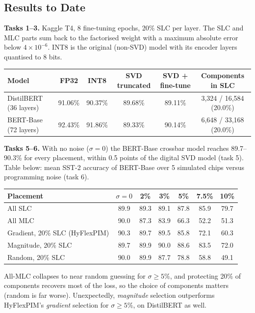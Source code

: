\documentclass[10pt,a4paper]{article}
\begin{document}
\subsection{Results to Date}
\textbf{Tasks 1--3.} Kaggle T4, 8 fine-tuning epochs, 20\% SLC per layer. The SLC and MLC parts sum back
to the factorised weight with a maximum absolute error below $4\times10^{-6}$. INT8 is the original
(non-SVD) model with its encoder layers quantised to 8 bits.

\begin{table}[h]
\centering\small
\begin{tabular}{@{}lccccc@{}}
\toprule
Model & FP32 & INT8 & SVD truncated & SVD + fine-tune & Components in SLC \\
\midrule
DistilBERT (36 layers) & 91.06\% & 90.37\% & 89.68\% & 89.11\% & 3{,}324 / 16{,}584 (20.0\%) \\
BERT-Base (72 layers) & 92.43\% & 91.86\% & 89.33\% & 90.14\% & 6{,}648 / 33{,}168 (20.0\%) \\
\bottomrule
\end{tabular}
\end{table}

\noindent\textbf{Tasks 5--6.} With no noise ($\sigma=0$) the BERT-Base crossbar model reaches
89.7--90.3\% for every placement, within 0.5 points of the digital SVD model (task 5). Table below:
mean SST-2 accuracy of BERT-Base over 5 simulated chips versus programming noise (task 6).

\begin{table}[h]
\centering\small
\begin{tabular}{@{}lcccccc@{}}
\toprule
Placement & $\sigma=0$ & 2\% & 3\% & 5\% & 7.5\% & 10\% \\
\midrule
All SLC & 89.9 & 89.3 & 89.1 & 87.8 & 85.9 & 79.7 \\
All MLC & 90.0 & 87.3 & 83.9 & 66.3 & 52.2 & 51.3 \\
Gradient, 20\% SLC (HyFlexPIM) & 90.3 & 89.7 & 89.5 & 85.8 & 72.1 & 60.3 \\
Magnitude, 20\% SLC & 89.7 & 89.9 & 90.0 & 88.6 & 83.5 & 72.0 \\
Random, 20\% SLC & 90.0 & 89.9 & 87.7 & 78.8 & 58.8 & 49.1 \\
\bottomrule
\end{tabular}
\end{table}

\noindent All-MLC collapses to near random guessing for $\sigma\geq5\%$, and protecting 20\% of
components recovers most of the loss, so the choice of components matters (random is far worse).
Unexpectedly, \emph{magnitude} selection outperforms HyFlexPIM's \emph{gradient} selection for
$\sigma\geq5\%$, on DistilBERT as well.
\end{document}
